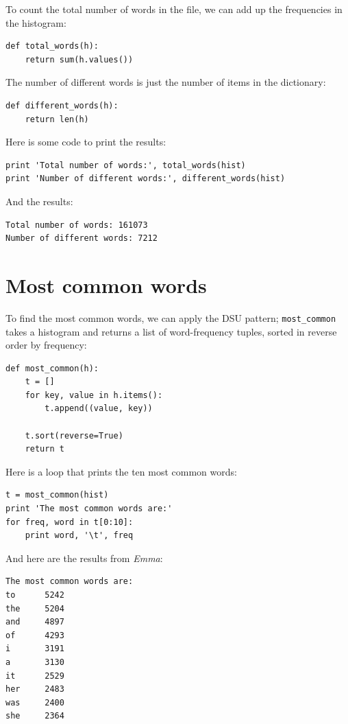 \documentclass[10pt]{book}
\begin{document}
{

To count the total number of words in the file, we can add up
the frequencies in the histogram:

\beforeverb
\begin{verbatim}
def total_words(h):
    return sum(h.values())
\end{verbatim}
\afterverb
%
The number of different words is just the number of items in
the dictionary:

\beforeverb
\begin{verbatim}
def different_words(h):
    return len(h)
\end{verbatim}
\afterverb
%
Here is some code to print the results:

\beforeverb
\begin{verbatim}
print 'Total number of words:', total_words(hist)
print 'Number of different words:', different_words(hist)
\end{verbatim}
\afterverb
%
And the results:

\beforeverb
\begin{verbatim}
Total number of words: 161073
Number of different words: 7212
\end{verbatim}
\afterverb
%

\section{Most common words}


To find the most common words, we can apply the DSU pattern;
\verb"most_common" takes a histogram and returns a list of
word-frequency tuples, sorted in reverse order by frequency:

\beforeverb
\begin{verbatim}
def most_common(h):
    t = []
    for key, value in h.items():
        t.append((value, key))

    t.sort(reverse=True)
    return t
\end{verbatim}
\afterverb
%
Here is a loop that prints the ten most common words:

\beforeverb
\begin{verbatim}
t = most_common(hist)
print 'The most common words are:'
for freq, word in t[0:10]:
    print word, '\t', freq
\end{verbatim}
\afterverb
%
And here are the results from {\em Emma}:

\beforeverb
\begin{verbatim}
The most common words are:
to      5242
the     5204
and     4897
of      4293
i       3191
a       3130
it      2529
her     2483
was     2400
she     2364
\end{verbatim}
\afterverb
%

}
\end{document}
